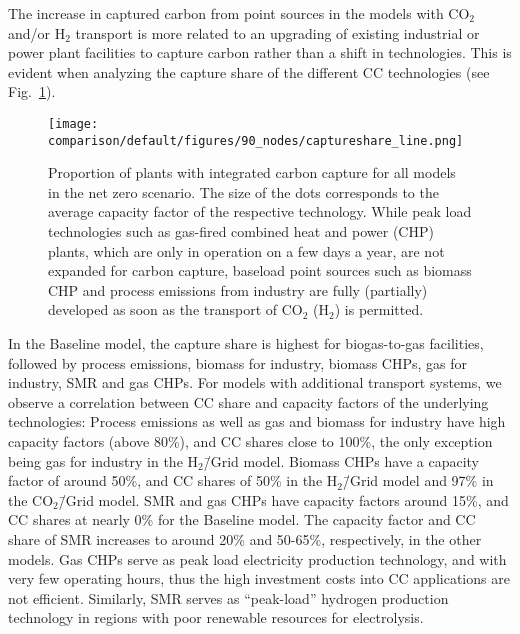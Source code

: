 \documentclass[twocolumn]{article}
\newcommand{\COtwo}{CO$_2$}
\newcommand{\Htwo}{H$_2$}
\newcommand{\modBase}{Baseline model}
\newcommand{\modCO}{CO$_2$\=/Grid model}
\newcommand{\modH}{H$_2$\=/Grid model}
\newcommand{\carbon}{CO$_2$}
\newcommand{\hydrogen}{H$_2$}
\newcommand{\baselinemodel}{Baseline model}
\begin{document}
The increase in captured carbon from point sources in the models with \carbon{} and/or \hydrogen{} transport is more related to an upgrading of existing industrial or power plant facilities to capture carbon rather than a shift in technologies. This is evident when analyzing the capture share of the different CC technologies (see Fig.~\ref{fig:captureshare_line}).


\begin{figure}[ht]
    \centering
    \texttt{[image: comparison/default/figures/90\_nodes/captureshare\_line.png]}
    \caption{Proportion of plants with integrated carbon capture for all models in the net zero scenario. The size of the dots corresponds to the average capacity factor of the respective technology. While peak load technologies such as gas-fired combined heat and power (CHP) plants, which are only in operation on a few days a year, are not expanded for carbon capture, baseload point sources such as biomass CHP and process emissions from industry are fully (partially) developed as soon as the transport of \COtwo{} (\Htwo{}) is permitted.}
    \label{fig:captureshare_line}
\end{figure}%

In the \modBase{}, the capture share is highest for biogas-to-gas facilities, followed by process emissions, biomass for industry, biomass CHPs, gas for industry, SMR and gas CHPs. For models with additional transport systems, we observe a correlation between CC share and capacity factors of the underlying technologies: Process emissions as well as gas and biomass for industry have high capacity factors (above 80\%), and CC shares close to 100\%, the only exception being gas for industry in the \modH{}. Biomass CHPs have a capacity factor of around 50\%, and CC shares of 50\% in the \modH{} and 97\% in the \modCO{}. SMR and gas CHPs have capacity factors around 15\%, and CC shares at nearly 0\% for the \baselinemodel. The capacity factor and CC share of SMR increases to around 20\% and 50-65\%, respectively, in the other models. Gas CHPs serve as peak load electricity production technology, and with very few operating hours, thus the high investment costs into CC applications are not efficient. Similarly, SMR serves as ``peak-load'' hydrogen production technology in regions with poor renewable resources for electrolysis.
\end{document}

